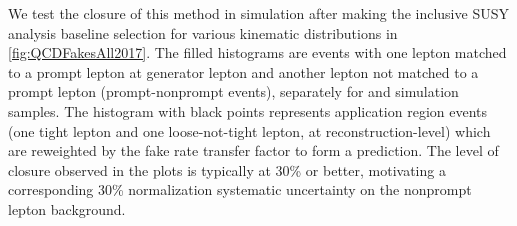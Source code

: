 \FloatBarrier

We test the closure of this method in simulation after making the inclusive
SUSY analysis baseline selection for various kinematic distributions in
\ref{fig:QCDFakesAll2017}. The filled histograms are events with one lepton
matched to a prompt lepton at generator lepton and another lepton not matched
to a prompt lepton (prompt-nonprompt events), separately for \ttjets and
\wjets simulation samples. The histogram with black points represents
application region events (one tight lepton and one loose-not-tight lepton,
at reconstruction-level) which are reweighted by the fake rate transfer
factor to form a prediction. The level of closure observed in the plots is
typically at 30\% or better, motivating a corresponding 30\% normalization
systematic uncertainty on the nonprompt lepton background.

